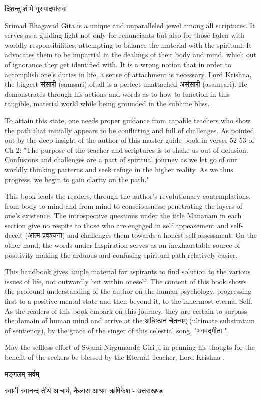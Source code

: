 दिशन्तु शं मे गुरुपादपांसवः

Srimad Bhagavad Gita is a unique and unparalleled jewel among all scriptures. It serves as a guiding light not only for renunciants but also for those laden with worldly responsibilities, attempting to balance the material with the spiritual. It advocates them to be impartial in the dealings of their body and mind, which out of ignorance they get identified with. It is a wrong notion that in order to accomplish one's duties in life, a sense of attachment is necessary. Lord Krishna, the biggest संसारी (samsari) of all is a perfect unattached असंसारी (asamsari). He demonstrates through his actions and words as to how to function in this tangible, material world while being grounded in the sublime bliss.

To attain this state, one needs proper guidance from capable teachers who show the path that initially appears to be conflicting and full of challenges. As pointed out by the deep insight of the author of this master guide book  in verses 52-53 of Ch 2:
"The purpose of the teacher and scriptures is to shake us out of delusion. Confusions and challenges are a part of spiritual journey as we let go of our worldly thinking patterns and seek refuge in the higher reality. As we thus progress, we begin to gain clarity on the path."

This book leads the readers, through the author's revolutionary contemplations, from body to mind and from mind to consciousness, penetrating the layers of one's existence. The introspective questions under the title Mananam in each section give no respite to those who are engaged in self appeasement and self-deceit (आत्म प्रवञ्चना) and challenges them towards a honest self-assessment. On the other hand, the words under Inspiration serves as an inexhaustable source of positivity making the arduous and confusing spiritual path relatively easier.

This handbook gives ample material for aspirants to find solution to the various issues of life, not outwardly but within oneself. The content of this book shows the profound understanding of the author on the human psychology, progressing first to a positive mental state and then beyond it, to the innermost eternal Self. As the readers of this book embark on this journey, they are certain to surpass the domain of human mind and arrive at the अधिष्ठान चैतन्यम् (ultimate substratum of sentiency), by the grace of the singer of this celestial song, "भगवद्गीता ".

May the selfless effort of Swami Nirgunanda Giri ji in penning his thougts for the benefit of the seekers be blessed by the Eternal Teacher, Lord Krishna .

मङ्गलम्  सर्वम्

स्वामी स्वानन्द तीर्थ
आचार्य, कैलास आश्रम
ऋषिकेश - उत्तराखण्ड

